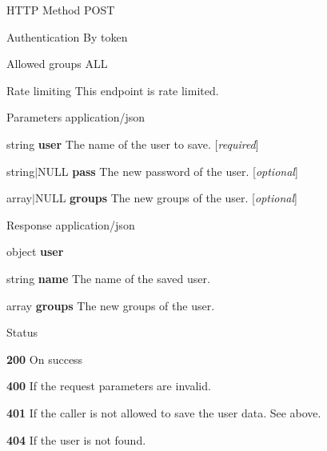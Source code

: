 \begin{DoxyParagraph}{H\+T\+TP Method}
P\+O\+ST 
\end{DoxyParagraph}
\begin{DoxyParagraph}{Authentication}
By token 
\end{DoxyParagraph}
\begin{DoxyParagraph}{Allowed groups}
{\ttfamily A\+LL} 
\end{DoxyParagraph}
\begin{DoxyParagraph}{Rate limiting}
This endpoint is rate limited.
\end{DoxyParagraph}
\begin{DoxyParagraph}{Parameters}
application/json
\begin{DoxyItemize}
\item {\ttfamily string} {\bfseries user} The name of the user to save. \mbox{[}{\itshape required}\mbox{]}
\item {\ttfamily string$\vert$\+N\+U\+LL} {\bfseries pass} The new password of the user. \mbox{[}{\itshape optional}\mbox{]}
\item {\ttfamily array$\vert$\+N\+U\+LL} {\bfseries groups} The new groups of the user. \mbox{[}{\itshape optional}\mbox{]}
\end{DoxyItemize}
\end{DoxyParagraph}
\begin{DoxyParagraph}{Response}
application/json
\begin{DoxyItemize}
\item {\ttfamily object} {\bfseries user}
\begin{DoxyItemize}
\item {\ttfamily string} {\bfseries name} The name of the saved user.
\item {\ttfamily array} {\bfseries groups} The new groups of the user.
\end{DoxyItemize}
\end{DoxyItemize}
\end{DoxyParagraph}
\begin{DoxyParagraph}{Status}

\begin{DoxyItemize}
\item {\bfseries 200} On success
\item {\bfseries 400} If the request parameters are invalid.
\item {\bfseries 401} If the caller is not allowed to save the user data. See above.
\item {\bfseries 404} If the user is not found. 
\end{DoxyItemize}
\end{DoxyParagraph}
